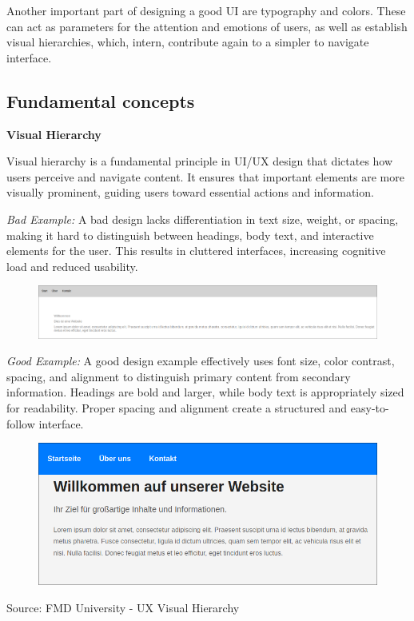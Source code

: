 \blankLine

Another important part of designing a good UI are typography and colors. These
can act as parameters for the attention and emotions of users, as well as establish visual hierarchies, which, intern, contribute again to a simpler to navigate interface. 

\autocite{Paul:UIUXIntroduction}

\subsection{Fundamental concepts}

\textbf{Visual Hierarchy}

Visual hierarchy is a fundamental principle in UI/UX design that dictates how users perceive and navigate content. It ensures that important elements are more visually prominent, guiding users toward essential actions and information.

\blankLine
\textit{Bad Example:}
A bad design lacks differentiation in text size, weight, or spacing, making it hard to distinguish between headings, body text, and interactive elements for the user. This results in cluttered interfaces, increasing cognitive load and reduced usability.

\begin{figure} [H]
    \includegraphics [width=1\textwidth] {images/paul/usabilityExamples/badVisualHierarchy.png}
    \caption{}
\end{figure}

\blankLine
\textit{Good Example:}
A good design example effectively uses font size, color contrast, spacing, and alignment to distinguish primary content from secondary information. Headings are bold and larger, while body text is appropriately sized for readability. Proper spacing and alignment create a structured and easy-to-follow interface.

\begin{figure} [H]
    \includegraphics [width=1\textwidth] {images/paul/usabilityExamples/goodVisualHierarchy.png}
    \caption{}
\end{figure}
Source: FMD University - UX Visual Hierarchy

